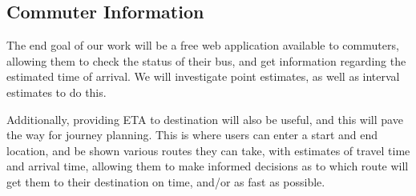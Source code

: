 \documentclass[12pt,a4paper]{article}
\begin{document}
\subsection{Commuter Information}
\label{sec:commuter-info}


The end goal of our work will be a free web application available to
commuters, allowing them to check the status of their bus,
and get information regarding the estimated time of arrival.
We will investigate point estimates, as well as interval estimates to do this.


Additionally, providing ETA to destination will also be useful,
and this will pave the way for journey planning.
This is where users can enter a start and end location,
and be shown various routes they can take,
with estimates of travel time and arrival time,
allowing them to make informed decisions as to which route will get them
to their destination on time, and/or as fast as possible.


















\end{document}

